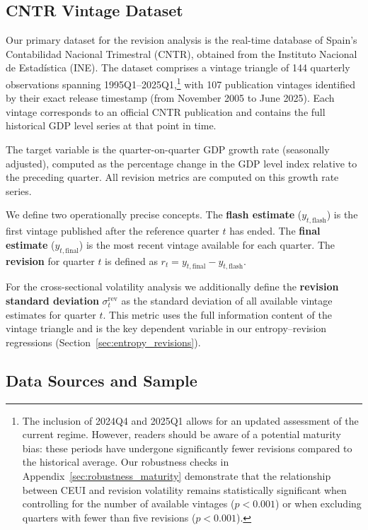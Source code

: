 \documentclass[12pt,a4paper]{article}
\theoremstyle{remark}
\begin{document}
\subsection{CNTR Vintage Dataset}
\label{sec:cntr_data}

Our primary dataset for the revision analysis is the real-time database of Spain's
Contabilidad Nacional Trimestral (CNTR), obtained from the Instituto Nacional de
Estad\'istica (INE). The dataset comprises a vintage triangle of 144 quarterly
observations spanning 1995Q1--2025Q1,\footnote{The inclusion of 2024Q4 and 2025Q1 allows for an updated assessment of the current regime. However, readers should be aware of a potential maturity bias: these periods have undergone significantly fewer revisions compared to the historical average. Our robustness checks in Appendix~\ref{sec:robustness_maturity} demonstrate that the relationship between CEUI and revision volatility remains statistically significant when controlling for the number of available vintages ($p<0.001$) or when excluding quarters with fewer than five revisions ($p<0.001$).} with 107 publication vintages identified by
their exact release timestamp (from November 2005 to June 2025). Each vintage
corresponds to an official CNTR publication and contains the full historical GDP
level series at that point in time.

The target variable is the quarter-on-quarter GDP growth rate (seasonally adjusted),
computed as the percentage change in the GDP level index relative to the preceding
quarter. All revision metrics are computed on this growth rate series.

We define two operationally precise concepts. The \textbf{flash estimate}
($y_{t,\text{flash}}$) is the first vintage published after the reference quarter $t$
has ended. The \textbf{final estimate} ($y_{t,\text{final}}$) is the most recent
vintage available for each quarter. The \textbf{revision} for quarter $t$ is defined
as $r_t = y_{t,\text{final}} - y_{t,\text{flash}}$.

For the cross-sectional volatility analysis we additionally define the
\textbf{revision standard deviation} $\sigma^{\text{rev}}_t$ as the standard deviation
of all available vintage estimates for quarter $t$. This metric uses the full
information content of the vintage triangle and is the key dependent variable in our
entropy--revision regressions (Section~\ref{sec:entropy_revisions}).


\subsection{Data Sources and Sample}
\end{document}
